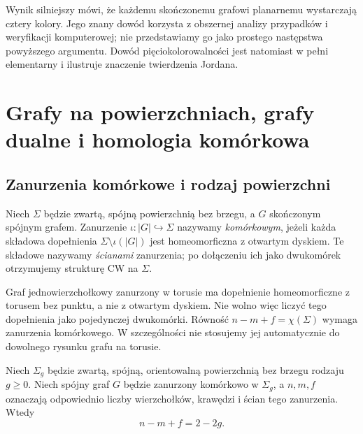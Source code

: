 \begin{uwaga}
Wynik silniejszy mówi, że każdemu skończonemu grafowi planarnemu
wystarczają cztery kolory. Jego znany dowód korzysta
z obszernej analizy przypadków i weryfikacji komputerowej;
nie przedstawiamy go jako prostego następstwa powyższego
argumentu. Dowód pięciokolorowalności jest natomiast
w pełni elementarny i ilustruje znaczenie twierdzenia Jordana.
\end{uwaga}


\chapter{Grafy na powierzchniach, grafy dualne i homologia komórkowa}
\label{ch:tg-powierzchnie}

\section{Zanurzenia komórkowe i rodzaj powierzchni}
\label{sec:tg-cellular-surface}

\begin{definicja}
Niech $\Sigma$ będzie zwartą, spójną powierzchnią bez brzegu,
a $G$ skończonym spójnym grafem. Zanurzenie
$\iota:|G|\hookrightarrow\Sigma$ nazywamy \emph{komórkowym},
jeżeli każda składowa dopełnienia $\Sigma\setminus\iota(|G|)$
jest homeomorficzna z otwartym dyskiem. Te składowe nazywamy
\emph{ścianami} zanurzenia; po dołączeniu ich jako dwukomórek
otrzymujemy strukturę CW na $\Sigma$.
\end{definicja}

\begin{uwaga}
Graf jednowierzchołkowy zanurzony w torusie ma dopełnienie
homeomorficzne z torusem bez punktu, a nie z otwartym dyskiem.
Nie wolno więc liczyć tego dopełnienia jako pojedynczej
dwukomórki. Równość $n-m+f=\chi(\Sigma)$ wymaga
zanurzenia komórkowego. W szczególności nie stosujemy jej
automatycznie do dowolnego rysunku grafu na torusie.
\end{uwaga}

\begin{twierdzenie}
\label{thm:tg-surface-euler}
Niech $\Sigma_g$ będzie zwartą, spójną, orientowalną powierzchnią
bez brzegu rodzaju $g\ge0$. Niech spójny graf $G$ będzie
zanurzony komórkowo w $\Sigma_g$, a $n,m,f$ oznaczają
odpowiednio liczby wierzchołków, krawędzi i ścian tego zanurzenia.
Wtedy
\[
 n-m+f=2-2g.
\]
\end{twierdzenie}

